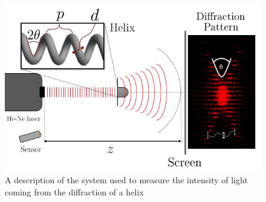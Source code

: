 \begin{figure}[H]
    \centering
    \includegraphics[width=0.9\columnwidth]{figures/Apparatus2.JPG}
    \caption{A description of the system used to measure the intensity of light coming from the diffraction of a helix}
    \label{fig:Apparatus}
\end{figure}